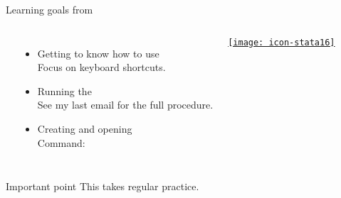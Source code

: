 \documentclass[t]{beamer}
\begin{document}
   \begin{frame}[t]{Learning goals from }

    \begin{columns}[T]


     \\[1em]

		\begin{itemize}
			\item Getting to know how to use \\[.5em]%
        Focus on keyboard shortcuts.\\[.5em]%
	        \item Running the \\[.5em]%
        See my last email for the full procedure.\\[.5em]%
			\item Creating and opening \\[.5em]%
        Command: \\[.5em]%
		\end{itemize}

      
      \begin{center}
        \vspace{-2em}
        \href{http://www.stata.com/}{\texttt{[image: icon-stata16]}}
      \end{center}

    \end{columns}
    
    \begin{alertblock}{Important point}
         This takes regular practice.
    \end{alertblock}

  \end{frame}
\end{document}
